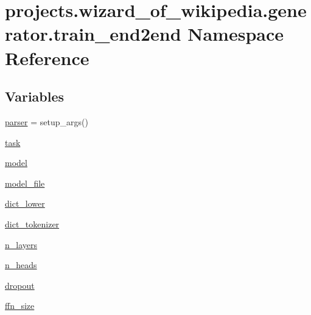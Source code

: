 \hypertarget{namespaceprojects_1_1wizard__of__wikipedia_1_1generator_1_1train__end2end}{}\section{projects.\+wizard\+\_\+of\+\_\+wikipedia.\+generator.\+train\+\_\+end2end Namespace Reference}
\label{namespaceprojects_1_1wizard__of__wikipedia_1_1generator_1_1train__end2end}
\subsection*{Variables}
\begin{DoxyCompactItemize}
\item 
\hyperlink{namespaceprojects_1_1wizard__of__wikipedia_1_1generator_1_1train__end2end_aad25450de311c4a13fa026e688e4040c}{parser} = setup\+\_\+args()
\item 
\hyperlink{namespaceprojects_1_1wizard__of__wikipedia_1_1generator_1_1train__end2end_a9a6ebb0da56fc43ddb0187a11d92e55a}{task}
\item 
\hyperlink{namespaceprojects_1_1wizard__of__wikipedia_1_1generator_1_1train__end2end_a4e43bf1ff52d72910624baa4a0051896}{model}
\item 
\hyperlink{namespaceprojects_1_1wizard__of__wikipedia_1_1generator_1_1train__end2end_a0d3b2244a86e6165771256742f676134}{model\+\_\+file}
\item 
\hyperlink{namespaceprojects_1_1wizard__of__wikipedia_1_1generator_1_1train__end2end_a14627d57d1f8a1dfeeec6572c922358d}{dict\+\_\+lower}
\item 
\hyperlink{namespaceprojects_1_1wizard__of__wikipedia_1_1generator_1_1train__end2end_a851b4bea7e4f3325ecff80d210db37ef}{dict\+\_\+tokenizer}
\item 
\hyperlink{namespaceprojects_1_1wizard__of__wikipedia_1_1generator_1_1train__end2end_a404b5a275a8b2d42ce6acd0d874985dd}{n\+\_\+layers}
\item 
\hyperlink{namespaceprojects_1_1wizard__of__wikipedia_1_1generator_1_1train__end2end_a16b87179c6f81fe36ffdee6be9aa6891}{n\+\_\+heads}
\item 
\hyperlink{namespaceprojects_1_1wizard__of__wikipedia_1_1generator_1_1train__end2end_ac31504ba24ad7575985f5f516e829def}{dropout}
\item 
\hyperlink{namespaceprojects_1_1wizard__of__wikipedia_1_1generator_1_1train__end2end_a2823f48ac297bfce509e32b755611a06}{ffn\+\_\+size}

\end{DoxyCompactItemize}
